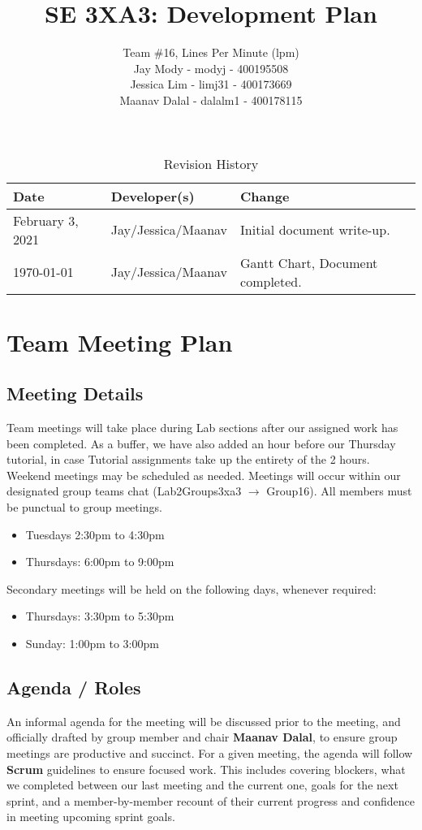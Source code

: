 \documentclass{article}
\title{\textbf{SE 3XA3: Development Plan}}
\author{Team \#16, Lines Per Minute (lpm) \\
Jay Mody - modyj - 400195508\\
Jessica Lim - limj31 - 400173669\\
Maanav Dalal - dalalm1 - 400178115\\
}
\begin{document}
\maketitle

\begin{table}[hp]
\caption{Revision History} \label{TblRevisionHistory}
\begin{tabularx}{\textwidth}{llX}
\toprule
\textbf{Date} & \textbf{Developer(s)} & \textbf{Change}\\
\midrule
February 3, 2021 & Jay/Jessica/Maanav & Initial document write-up. \\
\today & Jay/Jessica/Maanav & Gantt Chart, Document completed. \\
\bottomrule
\end{tabularx}
\end{table}

\newpage

\section{Team Meeting Plan}
\subsection*{Meeting Details}
Team meetings will take place during Lab sections after our assigned work has been completed. As a buffer, we have also added
an hour before our Thursday tutorial, in case Tutorial assignments take up the entirety of the 2 hours. Weekend meetings may be scheduled as needed. Meetings will occur within our designated group teams chat (Lab2Groups3xa3 $\rightarrow$ Group16). All members must be punctual to group meetings.
\begin{itemize}
    \item Tuesdays 2:30pm to 4:30pm
    \item Thursdays: 6:00pm to 9:00pm
\end{itemize}
Secondary meetings will be held on the following days, whenever required:
\begin{itemize}
    \item Thursdays: 3:30pm to 5:30pm
    \item Sunday: 1:00pm to 3:00pm
\end{itemize}

\subsection*{Agenda / Roles}
An informal agenda for the meeting will be discussed prior to the meeting, and officially drafted by group member and chair \textbf{Maanav Dalal}, to ensure group meetings are productive and succinct. For a given meeting, the agenda will follow \textbf{Scrum} guidelines to ensure focused work. This includes covering blockers, what we completed between our last meeting and the current one, goals for the next sprint, and a member-by-member recount of their current progress and confidence in meeting upcoming sprint goals.
\end{document}
